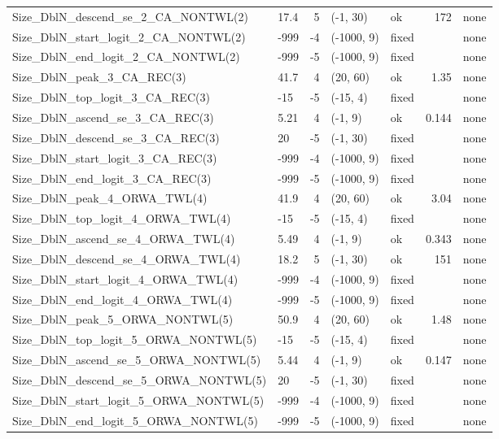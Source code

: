 \documentclass[
]{scrartcl}
\begin{document}
\begin{landscape}
\begin{longtable}{llrllrl}
Size\_DblN\_descend\_se\_2\_CA\_NONTWL(2) & 17.4 & 5 & (-1, 30) & ok & 172 & none \\ 
Size\_DblN\_start\_logit\_2\_CA\_NONTWL(2) & -999 & -4 & (-1000, 9) & fixed &  & none \\ 
Size\_DblN\_end\_logit\_2\_CA\_NONTWL(2) & -999 & -5 & (-1000, 9) & fixed &  & none \\ 
Size\_DblN\_peak\_3\_CA\_REC(3) & 41.7 & 4 & (20, 60) & ok & 1.35 & none \\ 
Size\_DblN\_top\_logit\_3\_CA\_REC(3) & -15 & -5 & (-15, 4) & fixed &  & none \\ 
Size\_DblN\_ascend\_se\_3\_CA\_REC(3) & 5.21 & 4 & (-1, 9) & ok & 0.144 & none \\ 
Size\_DblN\_descend\_se\_3\_CA\_REC(3) & 20 & -5 & (-1, 30) & fixed &  & none \\ 
Size\_DblN\_start\_logit\_3\_CA\_REC(3) & -999 & -4 & (-1000, 9) & fixed &  & none \\ 
Size\_DblN\_end\_logit\_3\_CA\_REC(3) & -999 & -5 & (-1000, 9) & fixed &  & none \\ 
Size\_DblN\_peak\_4\_ORWA\_TWL(4) & 41.9 & 4 & (20, 60) & ok & 3.04 & none \\ 
Size\_DblN\_top\_logit\_4\_ORWA\_TWL(4) & -15 & -5 & (-15, 4) & fixed &  & none \\ 
Size\_DblN\_ascend\_se\_4\_ORWA\_TWL(4) & 5.49 & 4 & (-1, 9) & ok & 0.343 & none \\ 
Size\_DblN\_descend\_se\_4\_ORWA\_TWL(4) & 18.2 & 5 & (-1, 30) & ok & 151 & none \\ 
Size\_DblN\_start\_logit\_4\_ORWA\_TWL(4) & -999 & -4 & (-1000, 9) & fixed &  & none \\ 
Size\_DblN\_end\_logit\_4\_ORWA\_TWL(4) & -999 & -5 & (-1000, 9) & fixed &  & none \\ 
Size\_DblN\_peak\_5\_ORWA\_NONTWL(5) & 50.9 & 4 & (20, 60) & ok & 1.48 & none \\ 
Size\_DblN\_top\_logit\_5\_ORWA\_NONTWL(5) & -15 & -5 & (-15, 4) & fixed &  & none \\ 
Size\_DblN\_ascend\_se\_5\_ORWA\_NONTWL(5) & 5.44 & 4 & (-1, 9) & ok & 0.147 & none \\ 
Size\_DblN\_descend\_se\_5\_ORWA\_NONTWL(5) & 20 & -5 & (-1, 30) & fixed &  & none \\ 
Size\_DblN\_start\_logit\_5\_ORWA\_NONTWL(5) & -999 & -4 & (-1000, 9) & fixed &  & none \\ 
Size\_DblN\_end\_logit\_5\_ORWA\_NONTWL(5) & -999 & -5 & (-1000, 9) & fixed &  & none \\ 

\end{longtable}
\end{landscape}
\end{document}
